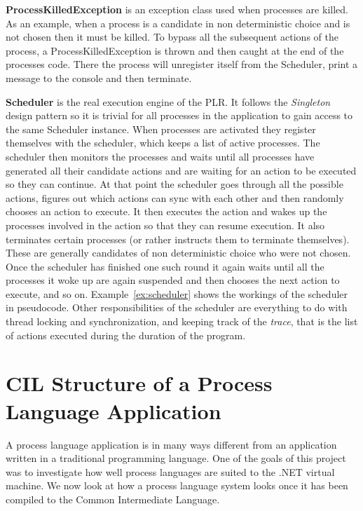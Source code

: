 	\textbf{ProcessKilledException} is an exception class used when processes
	are killed. As an example, when a process is a candidate in non deterministic
	choice and is not chosen then it must be killed. To bypass all the subsequent
	actions of the process, a \textsf{ProcessKilledException} is thrown and then
	caught at the end of the processes code. There the process will unregister
	itself from the \textsf{Scheduler}, print a message to the console and then
	terminate.
	
	\textbf{Scheduler} is the real execution engine of the PLR. It follows the
	\textit{Singleton}  design pattern so it is trivial for all
	processes in the application to gain access to the same \textsf{Scheduler}
	instance. When processes are activated they register themselves with the 
	scheduler, which keeps a list of active processes. The scheduler then monitors
	the processes and waits until all processes have generated all their candidate
	actions and are waiting for an action to be executed so they can continue.
	At that point the scheduler goes through all the possible actions, figures
	out which actions can sync with each other and then randomly chooses an
	action to execute. It then executes the action and wakes up the processes
	involved in the action so that they can resume execution. It also terminates
	certain processes (or rather instructs them to terminate themselves). These
	are generally candidates of non deterministic choice who were not chosen. 
	Once the scheduler has finished one such round it again waits until all 
	the processes it woke up are again suspended and then chooses the next
	action to execute, and so on. Example~\ref{ex:scheduler} shows the workings
	of the scheduler in pseudocode. Other responsibilities of the scheduler are
	everything to do with thread locking and synchronization, and keeping track of
	the \textit{trace}, that is the list of actions executed during the duration
	of the program.
	 

\section{CIL Structure of a Process Language Application}\label{cil_structure}

	A process language application is in many ways different from an application
	written in a traditional programming language. One of the goals of this 
	project was to investigate how well process languages are suited to the .NET
	virtual machine. We now look at how a process language system looks 
	once it has been compiled to the Common Intermediate Language.
	
